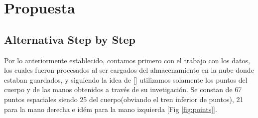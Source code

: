 \chapter{Propuesta}\label{chapter:proposal}
%

\section{Alternativa Step by Step}\label{section:proposal:stepbystep}

Por lo anteriormente establecido, contamos primero con el trabajo con los datos, los cuales fueron procesados al ser cargados del almacenamiento en la nube donde estaban guardados, y siguiendo la idea de [\cite{leynier-lsc-2021}] utilizamos solamente los puntos del cuerpo y de las manos obtenidos a través de su invetigación. Se constan de 67 puntos espaciales siendo 25 del cuerpo(obviando el tren inferior de puntos), 21 para la mano derecha e idém para la mano izquierda [Fig \ref{fig:points}]. 

